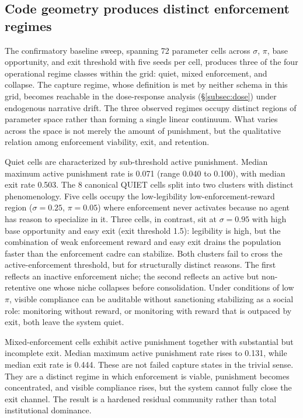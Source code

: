 \documentclass[12pt]{article}
\begin{document}
\subsection{Code geometry produces distinct enforcement regimes}

The confirmatory baseline sweep, spanning 72 parameter cells across $\sigma$, $\pi$, base opportunity, and exit threshold with five seeds per cell, produces three of the four operational regime classes within the grid: quiet, mixed enforcement, and collapse. The capture regime, whose definition is met by neither schema in this grid, becomes reachable in the dose-response analysis (\S\ref{subsec:dose}) under endogenous narrative drift. The three observed regimes occupy distinct regions of parameter space rather than forming a single linear continuum. What varies across the space is not merely the amount of punishment, but the qualitative relation among enforcement viability, exit, and retention.

Quiet cells are characterized by sub-threshold active punishment. Median maximum active punishment rate is 0.071 (range 0.040 to 0.100), with median exit rate 0.503. The 8 canonical QUIET cells split into two clusters with distinct phenomenology. Five cells occupy the low-legibility low-enforcement-reward region ($\sigma = 0.25$, $\pi = 0.05$) where enforcement never activates because no agent has reason to specialize in it. Three cells, in contrast, sit at $\sigma = 0.95$ with high base opportunity and easy exit (exit threshold 1.5): legibility is high, but the combination of weak enforcement reward and easy exit drains the population faster than the enforcement cadre can stabilize. Both clusters fail to cross the active-enforcement threshold, but for structurally distinct reasons. The first reflects an inactive enforcement niche; the second reflects an active but non-retentive one whose niche collapses before consolidation. Under conditions of low $\pi$, visible compliance can be auditable without sanctioning stabilizing as a social role: monitoring without reward, or monitoring with reward that is outpaced by exit, both leave the system quiet.

Mixed-enforcement cells exhibit active punishment together with substantial but incomplete exit. Median maximum active punishment rate rises to 0.131, while median exit rate is 0.444. These are not failed capture states in the trivial sense. They are a distinct regime in which enforcement is viable, punishment becomes concentrated, and visible compliance rises, but the system cannot fully close the exit channel. The result is a hardened residual community rather than total institutional dominance.
\end{document}
